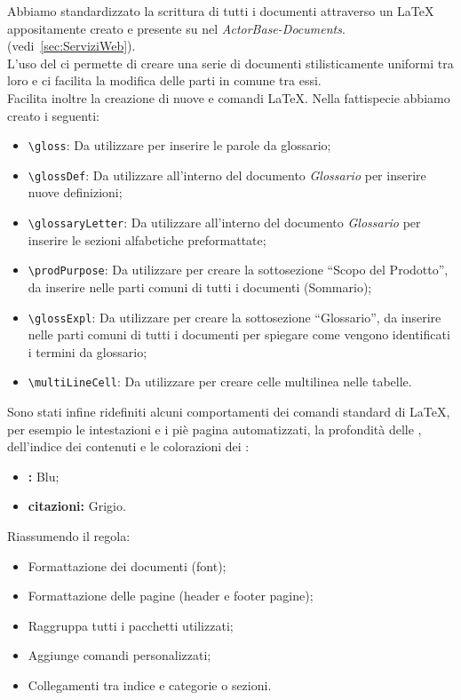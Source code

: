 \documentclass{scalatekids-article}
\begin{document}
\label{sec:strutturadoc}
Abbiamo standardizzato la scrittura di tutti i documenti attraverso un
 \LaTeX\xspace appositamente creato e presente su
\textit{} nel  \textit{ActorBase-Documents}. (vedi~\ref{sec:ServiziWeb}).\\
L'uso del  ci permette di creare una serie di documenti
stilisticamente uniformi tra loro e ci facilita la modifica delle parti in
comune tra essi.\\Facilita inoltre la creazione di nuove  e comandi
\LaTeX\xspace. Nella fattispecie abbiamo creato i seguenti:
\begin{itemize}
\item\verb=\gloss=: Da utilizzare per inserire le parole da glossario;
\item\verb=\glossDef=: Da utilizzare all'interno del documento \textit{Glossario} per inserire nuove definizioni;
\item\verb=\glossaryLetter=: Da utilizzare all'interno del documento \textit{Glossario} per inserire le sezioni alfabetiche preformattate;
\item\verb=\prodPurpose=: Da utilizzare per creare la sottosezione ``Scopo del Prodotto'', da inserire nelle parti comuni di tutti i documenti (Sommario);
\item\verb=\glossExpl=: Da utilizzare per creare la sottosezione ``Glossario'', da inserire nelle parti comuni di tutti i documenti per spiegare come vengono identificati i termini da glossario;
\item\verb=\multiLineCell=: Da utilizzare per creare celle multilinea nelle tabelle.
\end{itemize}
Sono stati infine ridefiniti alcuni comportamenti dei comandi standard di
\LaTeX\xspace, per esempio le intestazioni e i piè pagina automatizzati, la
profondità delle , dell'indice dei contenuti e le colorazioni dei
:
\begin{itemize}
\item\textbf{:} Blu;
\item\textbf{citazioni:} Grigio.
\end{itemize}
Riassumendo il  regola:
\begin{itemize}
\item Formattazione dei documenti (font);
\item Formattazione delle pagine (header e footer pagine);
\item Raggruppa tutti i pacchetti utilizzati;
\item Aggiunge comandi personalizzati;
\item Collegamenti tra indice e categorie o sezioni.
\end{itemize}
\end{document}
